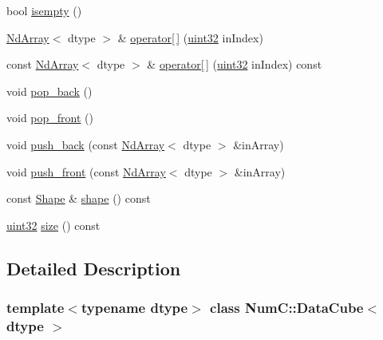 \begin{DoxyCompactItemize}
\item 
bool \mbox{\hyperlink{class_num_c_1_1_data_cube_a2f2f6afb06821995c7b640d96d2261fc}{isempty}} ()
\item 
\mbox{\hyperlink{class_num_c_1_1_nd_array}{Nd\+Array}}$<$ dtype $>$ \& \mbox{\hyperlink{class_num_c_1_1_data_cube_ab597af34271cd67d79bd1e9dd2305cf3}{operator\mbox{[}$\,$\mbox{]}}} (\mbox{\hyperlink{namespace_num_c_ae685802ca6d3035f2b400b081e3953fa}{uint32}} in\+Index)
\item 
const \mbox{\hyperlink{class_num_c_1_1_nd_array}{Nd\+Array}}$<$ dtype $>$ \& \mbox{\hyperlink{class_num_c_1_1_data_cube_a147e32ef2549de0cdb946eebaf624b9d}{operator\mbox{[}$\,$\mbox{]}}} (\mbox{\hyperlink{namespace_num_c_ae685802ca6d3035f2b400b081e3953fa}{uint32}} in\+Index) const
\item 
void \mbox{\hyperlink{class_num_c_1_1_data_cube_acdd92c25e800265b8d142b9f1a4baaa8}{pop\+\_\+back}} ()
\item 
void \mbox{\hyperlink{class_num_c_1_1_data_cube_a92928548c47184fda99c6759c1640421}{pop\+\_\+front}} ()
\item 
void \mbox{\hyperlink{class_num_c_1_1_data_cube_aeadab8945ec7c380ae010e23c5ace1ec}{push\+\_\+back}} (const \mbox{\hyperlink{class_num_c_1_1_nd_array}{Nd\+Array}}$<$ dtype $>$ \&in\+Array)
\item 
void \mbox{\hyperlink{class_num_c_1_1_data_cube_a3f386367e0a1a6f00b535c7d97198ade}{push\+\_\+front}} (const \mbox{\hyperlink{class_num_c_1_1_nd_array}{Nd\+Array}}$<$ dtype $>$ \&in\+Array)
\item 
const \mbox{\hyperlink{class_num_c_1_1_shape}{Shape}} \& \mbox{\hyperlink{class_num_c_1_1_data_cube_a1f65cef25b7b9b8b0371694e7898880e}{shape}} () const
\item 
\mbox{\hyperlink{namespace_num_c_ae685802ca6d3035f2b400b081e3953fa}{uint32}} \mbox{\hyperlink{class_num_c_1_1_data_cube_a69051739dd638a04caed8ba001f01879}{size}} () const
\end{DoxyCompactItemize}


\subsection{Detailed Description}
\subsubsection*{template$<$typename dtype$>$\newline
class Num\+C\+::\+Data\+Cube$<$ dtype $>$}

